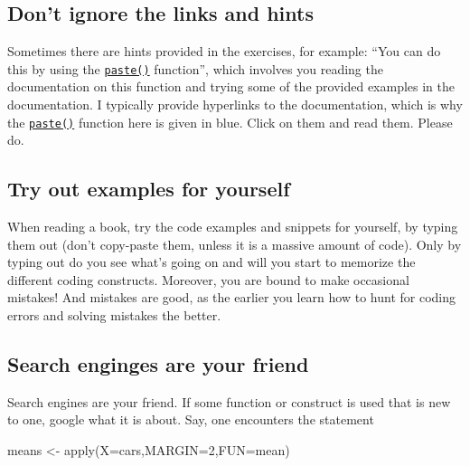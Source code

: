\documentclass[
]{book}
\newenvironment{Shaded}{\begin{snugshade}}{\end{snugshade}}
\newcommand{\AttributeTok}[1]{\textcolor[rgb]{0.77,0.63,0.00}{#1}}
\newcommand{\DecValTok}[1]{\textcolor[rgb]{0.00,0.00,0.81}{#1}}
\newcommand{\FunctionTok}[1]{\textcolor[rgb]{0.00,0.00,0.00}{#1}}
\newcommand{\NormalTok}[1]{#1}
\newcommand{\OtherTok}[1]{\textcolor[rgb]{0.56,0.35,0.01}{#1}}
\begin{document}
\hypertarget{dont-ignore-the-links-and-hints}{%
\subsection{Don't ignore the links and hints}\label{dont-ignore-the-links-and-hints}}

Sometimes there are hints provided in the exercises, for example:
``You can do this by using the \href{https://stat.ethz.ch/R-manual/R-patched/library/base/html/paste.html}{\texttt{paste()}} function'', which involves
you reading the documentation on this function and trying
some of the provided examples in the documentation. I typically provide hyperlinks to the documentation, which is why the \href{https://stat.ethz.ch/R-manual/R-patched/library/base/html/paste.html}{\texttt{paste()}} function here is given in blue. Click on them and read them. Please do.

\hypertarget{try-out-examples-for-yourself}{%
\subsection{Try out examples for yourself}\label{try-out-examples-for-yourself}}

When reading a book, try the code examples and snippets for yourself, by typing them out (don't copy-paste them, unless it is a massive amount of code). Only by typing out do you see what's going on and will you start to memorize the different coding constructs. Moreover, you are bound to make occasional mistakes! And mistakes are good, as the earlier you learn how to hunt for coding errors and solving mistakes the better.

\hypertarget{search-enginges-are-your-friend}{%
\subsection{Search enginges are your friend}\label{search-enginges-are-your-friend}}

Search engines are your friend. If some function or construct is used that is new to one, google what it is about. Say, one encounters the statement

\begin{Shaded}
\begin{Highlighting}[]
\NormalTok{means }\OtherTok{\textless{}{-}} \FunctionTok{apply}\NormalTok{(}\AttributeTok{X=}\NormalTok{cars,}\AttributeTok{MARGIN=}\DecValTok{2}\NormalTok{,}\AttributeTok{FUN=}\NormalTok{mean)}
\end{Highlighting}
\end{Shaded}
\end{document}
